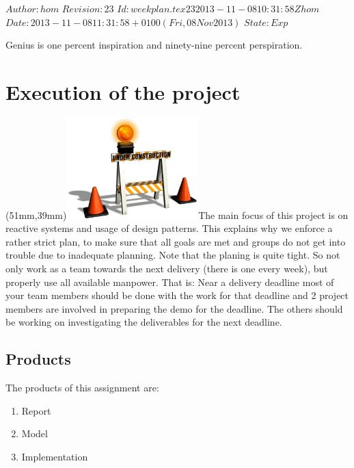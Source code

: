 \renewcommand\TheFile{weekplan.tex}
\SVN $Author: hom $
\SVN $Revision: 23 $
\SVN $Id: weekplan.tex 23 2013-11-08 10:31:58Z hom $
\SVN $Date: 2013-11-08 11:31:58 +0100 (Fri, 08 Nov 2013) $
\SVN $State: Exp $
\begin{savequote}[8cm]
  \sffamily
  Genius is one percent inspiration and ninety-nine percent perspiration.
\end{savequote}
\chapter{Execution of the project}

\parpic(51mm,39mm){\includegraphics[width=51mm]{figures/WorkinProgress.jpg}}The
main focus of this project is on reactive systems and usage of
design patterns. This explains why we enforce a rather strict plan, to
make sure that all goals are met and groups do not get into trouble
due to inadequate planning. Note that the planing is quite tight. So
not only work as a team towards the next delivery (there is one every
week), but properly use all available manpower. That is: Near a
delivery deadline most of your team members should be done with the
work for that deadline and 2 project members are  involved in preparing
the demo for the deadline. The others should be working on
investigating the deliverables for the next deadline.

\section{Products}

The products of this assignment are:
\begin{enumerate}
\item Report
\item Model
\item Implementation
\end{enumerate}

